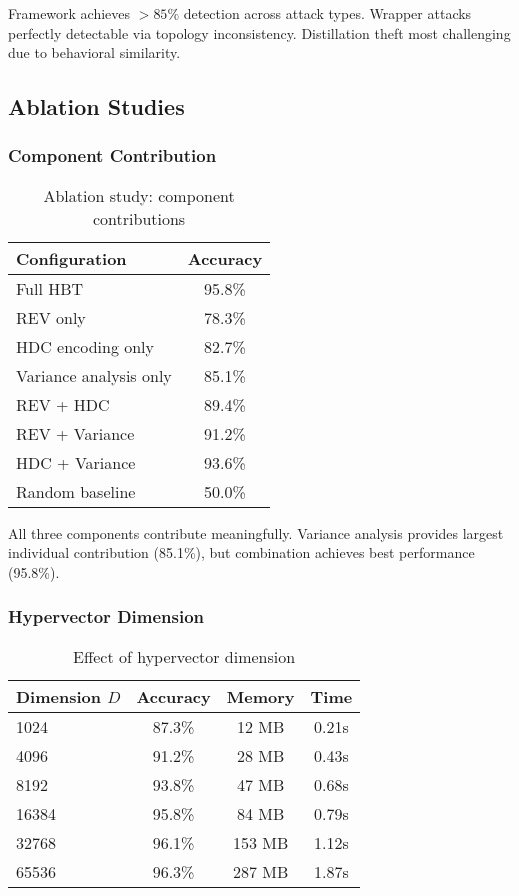 \documentclass[11pt,a4paper]{article}
\begin{document}
Framework achieves $>85\%$ detection across attack types. Wrapper attacks perfectly detectable via topology inconsistency. Distillation theft most challenging due to behavioral similarity.

\subsection{Ablation Studies}

\subsubsection{Component Contribution}

\begin{table}[h]
\centering
\caption{Ablation study: component contributions}
\label{tab:ablation}
\begin{tabular}{lc}
\toprule
Configuration & Accuracy \\
\midrule
Full HBT & 95.8\% \\
REV only & 78.3\% \\
HDC encoding only & 82.7\% \\
Variance analysis only & 85.1\% \\
REV + HDC & 89.4\% \\
REV + Variance & 91.2\% \\
HDC + Variance & 93.6\% \\
Random baseline & 50.0\% \\
\bottomrule
\end{tabular}
\end{table}

All three components contribute meaningfully. Variance analysis provides largest individual contribution (85.1\%), but combination achieves best performance (95.8\%).

\subsubsection{Hypervector Dimension}

\begin{table}[h]
\centering
\caption{Effect of hypervector dimension}
\label{tab:dimension}
\begin{tabular}{lccc}
\toprule
Dimension $D$ & Accuracy & Memory & Time \\
\midrule
1024 & 87.3\% & 12 MB & 0.21s \\
4096 & 91.2\% & 28 MB & 0.43s \\
8192 & 93.8\% & 47 MB & 0.68s \\
16384 & 95.8\% & 84 MB & 0.79s \\
32768 & 96.1\% & 153 MB & 1.12s \\
65536 & 96.3\% & 287 MB & 1.87s \\
\bottomrule
\end{tabular}
\end{table}
\end{document}
